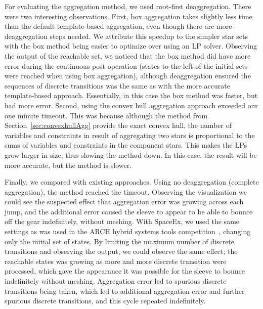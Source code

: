 For evaluating the aggregation method, we used root-first deaggregation.
%
There were two interesting observations.
%
First, box aggregation takes slightly less time than the default template-based aggregation, even though there are more deaggregation steps needed.
%
We attribute this speedup to the simpler star sets with the box method being easier to optimize over using an LP solver.
%
Observing the output of the reachable set, we noticed that the box method did have more error during the continuous post operation
(states to the left of the initial sets were reached when using box aggregation),
although deaggregation ensured the sequences of discrete transitions
was the same as with the more accurate template-based approach.
%
Essentially, in this case the box method was faster, but had more error.
%
Second, using the convex hull aggregation approach exceeded our one minute timeout.
%
This was because although the method from Section~\ref{sec:convexhullAgg} provide the exact convex hull, the number of variables and constraints
in result of aggregating two stars is proportional to the sums of variables and constraints in the component stars.
%
This makes the LPs grow larger in size, thus slowing the method down.
%
In this case, the result will be more accurate, but the method is slower.

Finally, we compared with existing approaches.
%
Using no deaggregation (complete aggregation), the method reached the timeout.
%
Observing the visualization we could see the suspected effect that aggregation error was growing across each jump, and
the additional error caused the sleeve to appear to be able to bounce off the gear indefinitely, without meshing.
%
With SpaceEx, we used the same settings as was used in the ARCH hybrid systems tools competition~\cite{archcomp19},
changing only the initial set of states.
%
By limiting the maximum number of discrete transitions and observing the output,
we could observe the same effect; the reachable states was growing as more and more discrete transition were processed, which
gave the appearance it was possible for the sleeve to bounce indefinitely without meshing.
%
Aggregation error led to spurious discrete transitions being taken, which led to additional aggregation error and further
spurious discrete transitions, and this cycle repeated indefinitely.
\vspace{-0.1cm}

%
